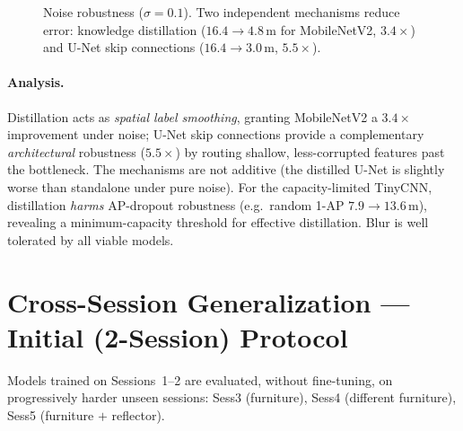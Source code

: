 \documentclass[11pt,a4paper]{article}
\begin{document}
\begin{figure}[H]
\centering
{}
\caption{Noise robustness ($\sigma{=}0.1$). Two independent mechanisms reduce error: knowledge
distillation ($16.4\!\to\!4.8$\,m for MobileNetV2, $3.4\times$) and U-Net skip connections
($16.4\!\to\!3.0$\,m, $5.5\times$).}
\end{figure}

\paragraph{Analysis.} Distillation acts as \emph{spatial label smoothing}, granting MobileNetV2 a
$3.4\times$ improvement under noise; U-Net skip connections provide a complementary
\emph{architectural} robustness ($5.5\times$) by routing shallow, less-corrupted features past the
bottleneck. The mechanisms are not additive (the distilled U-Net is slightly worse than standalone
under pure noise). For the capacity-limited TinyCNN, distillation \emph{harms} AP-dropout
robustness (e.g.\ random 1-AP $7.9\!\to\!13.6$\,m), revealing a minimum-capacity threshold for
effective distillation. Blur is well tolerated by all viable models.

\section{Cross-Session Generalization --- Initial (2-Session) Protocol}
\label{sec:cross_old}

Models trained on Sessions~1--2 are evaluated, without fine-tuning, on progressively harder
unseen sessions: Sess3 (furniture), Sess4 (different furniture), Sess5 (furniture $+$ reflector).
\end{document}
